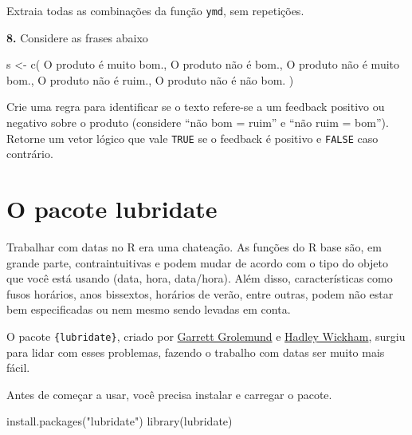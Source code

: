\documentclass[
]{book}
\newenvironment{Shaded}{\begin{snugshade}}{\end{snugshade}}
\newcommand{\FunctionTok}[1]{\textcolor[rgb]{0.00,0.00,0.00}{#1}}
\newcommand{\NormalTok}[1]{#1}
\newcommand{\OtherTok}[1]{\textcolor[rgb]{0.56,0.35,0.01}{#1}}
\newcommand{\StringTok}[1]{\textcolor[rgb]{0.31,0.60,0.02}{#1}}
\begin{document}
Extraia todas as combinações da função \texttt{ymd}, sem repetições.

\textbf{8.} Considere as frases abaixo

\begin{Shaded}
\begin{Highlighting}[]
\NormalTok{s }\OtherTok{\textless{}{-}} \FunctionTok{c}\NormalTok{(}
  \StringTok{\textquotesingle{}O produto é muito bom.\textquotesingle{}}\NormalTok{,}
  \StringTok{\textquotesingle{}O produto não é bom.\textquotesingle{}}\NormalTok{,}
  \StringTok{\textquotesingle{}O produto não é muito bom.\textquotesingle{}}\NormalTok{,}
  \StringTok{\textquotesingle{}O produto não é ruim.\textquotesingle{}}\NormalTok{,}
  \StringTok{\textquotesingle{}O produto não é não bom.\textquotesingle{}}
\NormalTok{)}
\end{Highlighting}
\end{Shaded}

Crie uma regra para identificar se o texto refere-se a um feedback positivo ou negativo sobre o produto (considere ``não bom = ruim'' e ``não ruim = bom''). Retorne um vetor lógico que vale \texttt{TRUE} se o feedback é positivo e \texttt{FALSE} caso contrário.

\hypertarget{o-pacote-lubridate}{%
\section{O pacote lubridate}\label{o-pacote-lubridate}}

Trabalhar com datas no R era uma chateação. As funções do R base são, em grande parte, contraintuitivas e podem mudar de acordo com o tipo do objeto que você está usando (data, hora, data/hora). Além disso, características como fusos horários, anos bissextos, horários de verão, entre outras, podem não estar bem especificadas ou nem mesmo sendo levadas em conta.

O pacote \texttt{\{lubridate\}}, criado por \href{https://github.com/garrettgman}{Garrett Grolemund} e \href{https://github.com/hadley}{Hadley Wickham}, surgiu para lidar com esses problemas, fazendo o trabalho com datas ser muito mais fácil.

Antes de começar a usar, você precisa instalar e carregar o pacote.

\begin{Shaded}
\begin{Highlighting}[]
\FunctionTok{install.packages}\NormalTok{(}\StringTok{"lubridate"}\NormalTok{)}
\FunctionTok{library}\NormalTok{(lubridate)}
\end{Highlighting}
\end{Shaded}
\end{document}
